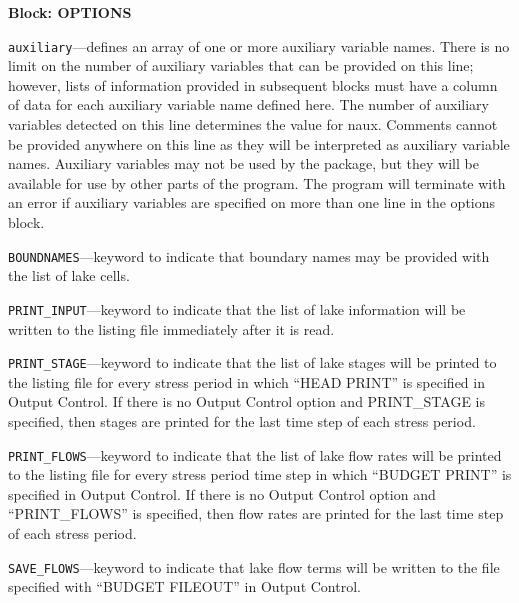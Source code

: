 
\item \textbf{Block: OPTIONS}

\begin{description}
\item \texttt{auxiliary}---defines an array of one or more auxiliary variable names.  There is no limit on the number of auxiliary variables that can be provided on this line; however, lists of information provided in subsequent blocks must have a column of data for each auxiliary variable name defined here.   The number of auxiliary variables detected on this line determines the value for naux.  Comments cannot be provided anywhere on this line as they will be interpreted as auxiliary variable names.  Auxiliary variables may not be used by the package, but they will be available for use by other parts of the program.  The program will terminate with an error if auxiliary variables are specified on more than one line in the options block.

\item \texttt{BOUNDNAMES}---keyword to indicate that boundary names may be provided with the list of lake cells.

\item \texttt{PRINT\_INPUT}---keyword to indicate that the list of lake information will be written to the listing file immediately after it is read.

\item \texttt{PRINT\_STAGE}---keyword to indicate that the list of lake stages will be printed to the listing file for every stress period in which ``HEAD PRINT'' is specified in Output Control.  If there is no Output Control option and PRINT\_STAGE is specified, then stages are printed for the last time step of each stress period.

\item \texttt{PRINT\_FLOWS}---keyword to indicate that the list of lake flow rates will be printed to the listing file for every stress period time step in which ``BUDGET PRINT'' is specified in Output Control.  If there is no Output Control option and ``PRINT\_FLOWS'' is specified, then flow rates are printed for the last time step of each stress period.

\item \texttt{SAVE\_FLOWS}---keyword to indicate that lake flow terms will be written to the file specified with ``BUDGET FILEOUT'' in Output Control.


\end{description}
